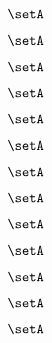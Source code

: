 \begin{forslides}
    \begin{equation}
        \label{eq:slides-translation-51}
        \setA
    \end{equation}

    \begin{equation}
        \label{eq:slides-translation-52}
        \setA
    \end{equation}

    \begin{equation}
        \label{eq:slides-translation-53}
        \setA
    \end{equation}

    \begin{equation}
        \label{eq:slides-translation-54}
        \setA
    \end{equation}

    \begin{equation}
        \label{eq:slides-translation-55}
        \setA
    \end{equation}

    \begin{equation}
        \label{eq:slides-translation-56}
        \setA
    \end{equation}

    \begin{equation}
        \label{eq:slides-translation-57}
        \setA
    \end{equation}

    \begin{equation}
        \label{eq:slides-translation-58}
        \setA
    \end{equation}

    \begin{equation}
        \label{eq:slides-translation-59}
        \setA
    \end{equation}
    
    \begin{equation}
        \label{eq:slides-translation-60}
        \setA
    \end{equation}

    \begin{equation}
        \label{eq:slides-translation-61}
        \setA
    \end{equation}

    \begin{equation}
        \label{eq:slides-translation-62}
        \setA
    \end{equation}

    \begin{equation}
        \label{eq:slides-translation-63}
        \setA
    \end{equation}


\end{forslides}
